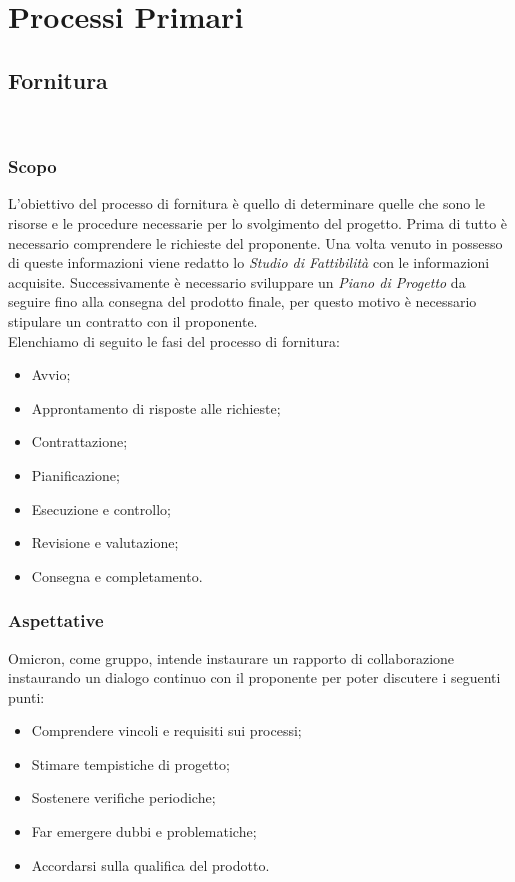 \section{Processi Primari}
\subsection{Fornitura}\
\subsubsection{Scopo}
L'obiettivo del processo di fornitura è quello di determinare quelle che sono le risorse e le procedure necessarie per lo svolgimento del progetto. 
Prima di tutto è necessario comprendere le richieste del proponente. Una volta venuto in possesso di queste informazioni viene redatto lo \textit{Studio di Fattibilità} con le informazioni acquisite.
Successivamente è necessario sviluppare un \textit{Piano di Progetto} da seguire fino alla consegna del prodotto finale, per questo motivo è necessario stipulare un contratto con il proponente.\\
Elenchiamo di seguito le fasi del processo di fornitura:
\begin{itemize}
    \item{Avvio;}
    \item{Approntamento di risposte alle richieste;}
    \item{Contrattazione;}
    \item{Pianificazione;}
    \item{Esecuzione e controllo;}
    \item{Revisione e valutazione;}
    \item{Consegna e completamento.}
\end{itemize}

\subsubsection{Aspettative}
Omicron, come gruppo, intende instaurare un rapporto di collaborazione instaurando un dialogo continuo con il proponente per poter discutere i seguenti punti:\\
\begin{itemize}
    \item{Comprendere vincoli e requisiti sui processi;}
    \item{Stimare tempistiche di progetto;}
    \item{Sostenere verifiche periodiche;}
    \item{Far emergere dubbi e problematiche;}
    \item{Accordarsi sulla qualifica del prodotto.}
\end{itemize}

